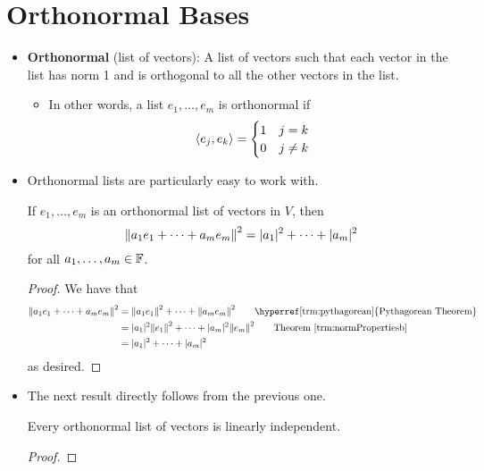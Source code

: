 \documentclass[../main.tex]{subfiles}
\begin{document}
\section{Orthonormal Bases}
\begin{itemize}
    \item {}\textbf{Orthonormal} (list of vectors): A list of vectors such that each vector in the list has norm 1 and is orthogonal to all the other vectors in the list.
    \begin{itemize}
        \item In other words, a list $e_1,\dots,e_m$ is orthonormal if
        \begin{equation*}
            \left\langle{e_j},{e_k}\right\rangle =
            \begin{cases}
                1 & j=k\\
                0 & j\neq k
            \end{cases}
        \end{equation*}
    \end{itemize}
    \item Orthonormal lists are particularly easy to work with.
    \begin{theorem}\label{trm:normOrthoLnlComb}
        If $e_1,\dots,e_m$ is an orthonormal list of vectors in $V$, then
        \begin{equation*}
            \norm{a_1e_1+\cdots+a_me_m}^2 = |a_1|^2+\cdots+|a_m|^2
        \end{equation*}
        for all $a_1,\dots,a_m\in\mathbb{F}$.
        \begin{proof}
            We have that
            \begin{align*}
                \norm{a_1e_1+\cdots+a_me_m}^2 &= \norm{a_1e_1}^2+\cdots+\norm{a_me_m}^2\tag*{\hyperref[trm:pythagorean]{Pythagorean Theorem}}\\
                &= |a_1|^2\norm{e_1}^2+\cdots+|a_m|^2\norm{e_m}^2\tag*{Theorem \ref{trm:normPropertiesb}}\\
                &= |a_1|^2+\cdots+|a_m|^2
            \end{align*}
            as desired.
        \end{proof}
    \end{theorem}
    \item The next result directly follows from the previous one.
    \begin{theorem}\label{trm:orthonormalLnlIndep}
        Every orthonormal list of vectors is linearly independent.
        \begin{proof}

\end{proof}
\end{theorem}
\end{itemize}
\end{document}
